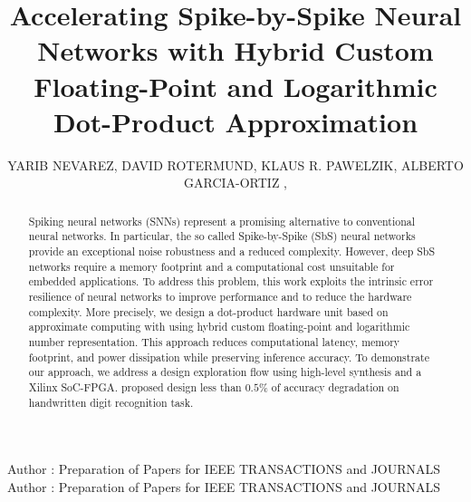 \title {Accelerating Spike-by-Spike Neural Networks  with Hybrid Custom Floating-Point and Logarithmic Dot-Product Approximation }

\author{
	\uppercase{Yarib Nevarez},	
	\uppercase{David Rotermund},
	\uppercase{Klaus R. Pawelzik},
	\uppercase{Alberto Garcia-Ortiz} ,
}

\address[1]{Institute of Electrodynamics and Microelectronics, University of Bremen, Bremen 28359, Germany (e-mail: nevarez@item.uni-bremen.de)}

\address[2]{Institute for Theoretical Physics, University of Bremen, Bremen 28359, Germany (e-mail: davrot@neuro.uni-bremen.de)}

\address[3]{Institute for Theoretical Physics, University of Bremen, Bremen 28359, Germany (e-mail: pawelzik@neuro.uni-bremen.de)}

\address[4]{Institute of Electrodynamics and Microelectronics, University of Bremen, Bremen 28359, Germany (e-mail: agarcia@item.uni-bremen.de)}


\markboth
{Author \headeretal: Preparation of Papers for IEEE TRANSACTIONS and JOURNALS}
{Author \headeretal: Preparation of Papers for IEEE TRANSACTIONS and JOURNALS}


\begin{abstract}
  Spiking neural networks (SNNs) represent a promising alternative to
  conventional neural networks. In particular, the so called
  Spike-by-Spike (SbS) neural networks provide an exceptional noise
  robustness and a reduced complexity. However, deep SbS networks
  require a memory footprint and a computational cost unsuitable for
  embedded applications. To address this problem, this work exploits
  the intrinsic error resilience of neural networks to improve
  performance and to reduce the hardware complexity. More precisely,
  we design a dot-product hardware unit based on approximate computing
  with 
  using hybrid custom floating-point and logarithmic number
  representation. This approach reduces computational latency, memory
  footprint, and power dissipation while preserving inference
  accuracy. To demonstrate our approach, we address a design
  exploration flow using high-level synthesis and a Xilinx SoC-FPGA.
   proposed design  less than
  $0.5\%$ of accuracy degradation on  handwritten digit
  recognition task.
	
\end{abstract}

